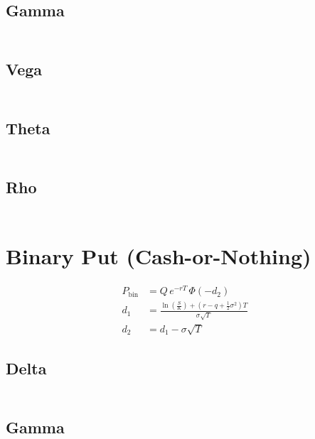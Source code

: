 \documentclass[12pt,a4paper]{article}
\begin{document}
\subsection{Gamma}
\[
  \begin{aligned}
  \end{aligned}
\]

\subsection{Vega}
\[
  \begin{aligned}
  \end{aligned}
\]

\subsection{Theta}
\[
  \begin{aligned}
  \end{aligned}
\]

\subsection{Rho}
\[
  \begin{aligned}
  \end{aligned}
\]

\section{Binary Put (Cash-or-Nothing)}

\[
  \begin{aligned}
    P_{\mathrm{bin}} & = Q \, e^{-rT} \,\Phi(-d_2)                                \\ d_1 & = \frac{\ln\!
    \left(\tfrac{S}{K}\right) + (r - q + \tfrac{1}{2}\sigma^2)T}{\sigma \sqrt{T}} \\
    d_2              & = d_1 - \sigma \sqrt{T}
  \end{aligned}
\]

\subsection{Delta}
\[
  \begin{aligned}
  \end{aligned}
\]

\subsection{Gamma}
\[
  \begin{aligned}
  \end{aligned}
\]
\end{document}
